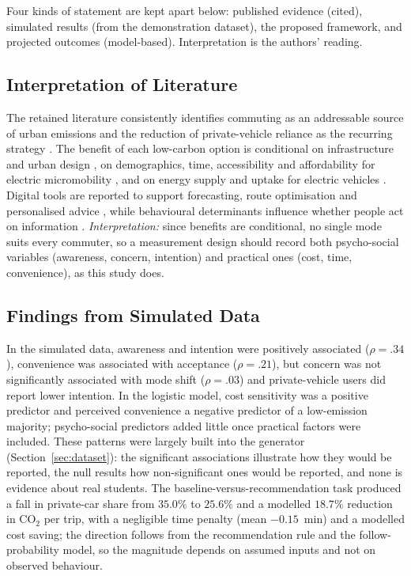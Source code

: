 \documentclass[11pt,a4paper]{article}
\begin{document}
Four kinds of statement are kept apart below: published evidence (cited), simulated results (from the
demonstration dataset), the proposed framework, and projected outcomes (model-based). Interpretation
is the authors' reading.

\subsection{Interpretation of Literature}
The retained literature consistently identifies commuting as an addressable source of urban emissions
and the reduction of private-vehicle reliance as the recurring strategy \citep{comi2024,eslami2025}.
The benefit of each low-carbon option is conditional on infrastructure and urban design
\citep{marzolla2025}, on demographics, time, accessibility and affordability for electric
micromobility \citep{wu2025}, and on energy supply and uptake for electric vehicles
\citep{ndhlovu2025}. Digital tools are reported to support forecasting, route optimisation and
personalised advice \citep{kashem2025,ouyang2025}, while behavioural determinants influence whether
people act on information \citep{eslami2025}. \textit{Interpretation:} since benefits are conditional,
no single mode suits every commuter, so a measurement design should record both psycho-social
variables (awareness, concern, intention) and practical ones (cost, time, convenience), as this study
does.

\subsection{Findings from Simulated Data}
In the simulated data, awareness and intention were positively associated ($\rho = .34$), convenience
was associated with acceptance ($\rho = .21$), but concern was not significantly associated with mode
shift ($\rho = .03$) and private-vehicle users did report lower intention. In the logistic model, cost
sensitivity was a positive predictor and perceived convenience a negative predictor of a low-emission
majority; psycho-social predictors added little once practical factors were included. These patterns
were largely built into the generator (Section~\ref{sec:dataset}): the significant associations
illustrate how they would be reported, the null results how non-significant ones would be reported, and
none is evidence about real students. The baseline-versus-recommendation task produced a fall in
private-car share from $35.0\%$ to $25.6\%$ and a modelled $18.7\%$ reduction in CO$_2$ per trip, with
a negligible time penalty (mean $-0.15$~min) and a modelled cost saving; the direction follows from the
recommendation rule and the follow-probability model, so the magnitude depends on assumed inputs and
not on observed behaviour.
\end{document}
